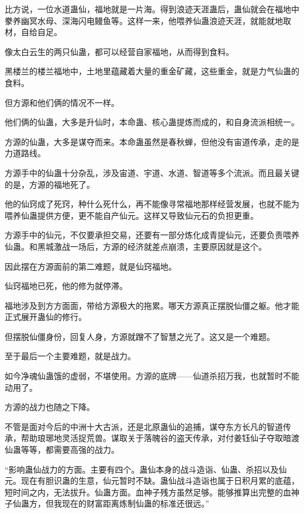 
\begin{this_body}



比方说，一位水道蛊仙，福地就是一片海。得到浪迹天涯蛊后，蛊仙就会在福地中豢养幽冥水母、深海闪电鳗鱼等。这样一来，他喂养仙蛊浪迹天涯，就能就地取材，自给自足。

像太白云生的两只仙蛊，都可以经营自家福地，从而得到食料。

黑楼兰的楼兰福地中，土地里蕴藏着大量的重金矿藏，这些重金，就是力气仙蛊的食料。

但方源和他们俩的情况不一样。

他们俩的仙蛊，大多是升仙时，本命蛊、核心蛊提炼而成的，和自身流派相统一。

方源的仙蛊，大多是谋夺而来。本命蛊虽然是春秋蝉，但他没有宙道传承，走的是力道路线。

方源手中的仙蛊十分杂乱，涉及宙道、宇道、水道、智道等多个流派。而且最关键的是，方源的福地死了。

他的仙窍成了死窍，种什么死什么，再不能像寻常福地那样经营发展，也就不能为喂养仙蛊提供方便，更不能自产仙元。这样又导致仙元石的负担更重。

方源手中的仙元，不仅要承担交易，还要有一部分炼化成青提仙元，还要负责喂养仙蛊。和黑城激战一场后，方源的经济就差点崩溃，主要原因就是这个。

因此摆在方源面前的第二难题，就是仙窍福地。

仙窍福地已死，他的修为就停滞。

福地涉及到方方面面，带给方源极大的拖累。哪天方源真正摆脱仙僵之躯。他才能正式展开蛊仙的修行。

但摆脱仙僵身份，回复人身，方源就蹭不了智慧之光了。这又是一个难题。

至于最后一个主要难题，就是战力。

如今净魂仙蛊饿的虚弱，不堪使用。方源的底牌——仙道杀招万我，也就暂时不能动用了。

方源的战力也随之下降。

不管是面对今后的中洲十大古派，还是北原蛊仙的追捕，谋夺东方长凡的智道传承，帮助琅琊地灵活捉荒兽。谋取关于落魄谷的盗天传承，对付姜钰仙子夺取暗渡仙蛊等等，都需要高强的战力。

“影响蛊仙战力的方面。主要有四个。蛊仙本身的战斗造诣、仙蛊、杀招以及仙元。现在有胆识蛊的生意，仙元暂时不缺。蛊仙战斗造诣也属于日积月累的底蕴，短时间之内，无法拔升。仙蛊方面。血神子残方虽然足够。能够推算出完整的血神子仙蛊方，但我现在的财富距离炼制仙蛊的标准还很远。”


\end{this_body}
